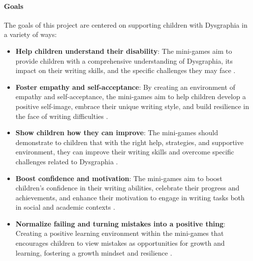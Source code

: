 \paragraph{Goals}
The goals of this project are centered on supporting children with Dysgraphia in a variety of ways:
\begin{itemize}
    \item \textbf{Help children understand their disability}: The mini-games aim to provide children with a comprehensive understanding of Dysgraphia, its impact on their writing skills, and the specific challenges they may face \cite{cleveland_dysgraphia}.
    \item \textbf{Foster empathy and self-acceptance}: By creating an environment of empathy and self-acceptance, the mini-games aim to help children develop a positive self-image, embrace their unique writing style, and build resilience in the face of writing difficulties \cite{understood_accommodations}.
    \item \textbf{Show children how they can improve}: The mini-games should demonstrate to children that with the right help, strategies, and supportive environment, they can improve their writing skills and overcome specific challenges related to Dysgraphia \cite{edutopia_dysgraphia}.
    \item \textbf{Boost confidence and motivation}: The mini-games aim to boost children's confidence in their writing abilities, celebrate their progress and achievements, and enhance their motivation to engage in writing tasks both in social and academic contexts \cite{pmc_dysgraphia}.
    \item \textbf{Normalize failing and turning mistakes into a positive thing}: Creating a positive learning environment within the mini-games that encourages children to view mistakes as opportunities for growth and learning, fostering a growth mindset and resilience \cite{edutopia_dysgraphia}.
\end{itemize}

